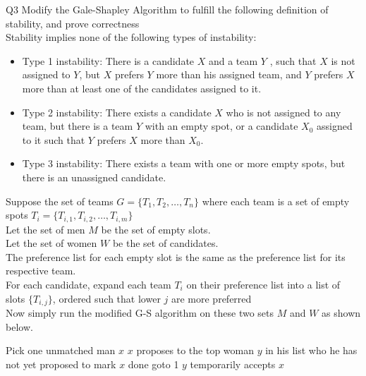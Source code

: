\begin{problem}
  {Q3}
    Modify the Gale-Shapley Algorithm to fulfill the following definition of stability, and prove correctness \\
    Stability implies none of the following types of instability: \\
    \begin{itemize}
      \item Type 1 instability: There is a candidate $X$ and a team $Y$ , such that
        $X$ is not assigned to $Y$, but $X$ prefers $Y$ more than his assigned team,
        and $Y$ prefers $X$ more than at least one of the candidates assigned
        to it.
      \item Type 2 instability: There exists a candidate $X$ who is not assigned to
        any team, but there is a team $Y$ with an empty spot, or a candidate
        $X_0$ assigned to it such that $Y$ prefers $X$ more than $X_0$.
      \item Type 3 instability: There exists a team with one or more empty
        spots, but there is an unassigned candidate.
    \end{itemize}
    Suppose the set of teams $G = \{T_1, T_2, \dots, T_n\}$ where each team is a set of empty spots $T_i = \{T_{i, 1}, T_{i, 2}, \dots, T_{i, m}\}$ \\
    Let the set of men $M$ be the set of empty slots. \\
    Let the set of women $W$ be the set of candidates. \\
    The preference list for each empty slot is the same as the preference list for its respective team. \\
    For each candidate, expand each team $T_{i}$ on their preference list into a list of slots $\{T_{i, j}\}$, ordered such that lower $j$ are more preferred \\
    Now simply run the modified G-S algorithm on these two sets $M$ and $W$ as shown below.
    \begin{algorithmic}[1]
      \STATE Pick one unmatched man $x$
        \STATE $x$ proposes to the top woman $y$ in his list who he has not yet proposed to
      \ELSE
        \STATE mark $x$ done
        \STATE goto 1
      \ENDIF
        \STATE $y$ temporarily accepts $x$

\end{algorithmic}
\end{problem}
